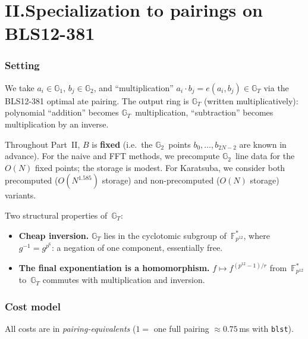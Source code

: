 \documentclass[11pt]{article}
\newcommand{\Gt}{\mathbb{G}_T}
\newcommand{\Gone}{\mathbb{G}_1}
\newcommand{\Gtwo}{\mathbb{G}_2}
\newcommand{\Fpk}{\mathbb{F}_{p^{12}}}
\theoremstyle{plain}
\theoremstyle{remark}
\begin{document}
\part*{II.\quad Specialization to pairings on BLS12-381}

\section{Setting}

We take $a_i \in \Gone$, $b_j \in \Gtwo$,
and ``multiplication'' $a_i \cdot b_j = e(a_i, b_j) \in \Gt$
via the BLS12-381 optimal ate pairing.
The output ring is $\Gt$ (written multiplicatively):
polynomial ``addition'' becomes $\Gt$~multiplication,
``subtraction'' becomes multiplication by an inverse.

\medskip\noindent
Throughout Part~II, $B$ is \textbf{fixed}
(i.e.\ the $\Gtwo$~points $b_0, \ldots, b_{2N-2}$ are known in advance).
For the naive and FFT methods,
we precompute $\Gtwo$~line data for the $O(N)$ fixed points;
the storage is modest.
For Karatsuba, we consider both
precomputed ($O(N^{1.585})$ storage) and
non-precomputed ($O(N)$ storage) variants.

\medskip\noindent
Two structural properties of~$\Gt$:
\begin{itemize}
\item \textbf{Cheap inversion.}
$\Gt$ lies in the cyclotomic subgroup of~$\Fpk^*$,
where $g^{-1} = g^{p^6}$:
a negation of one component, essentially free.

\item \textbf{The final exponentiation is a homomorphism.}
$f \mapsto f^{(p^{12}-1)/r}$ from~$\Fpk^*$ to~$\Gt$
commutes with multiplication and inversion.
\end{itemize}

\section{Cost model}

All costs are in \emph{pairing-equivalents}
($1 =$ one full pairing $\approx 0.75$\,ms with \texttt{blst}).
\end{document}
